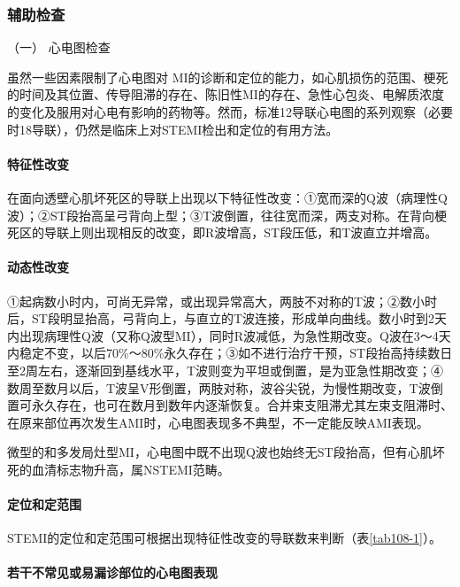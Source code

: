 \subsubsection{辅助检查}

\hypertarget{text00312.htmlux5cux23CHP10-8-2-2-2-1}{}
（一） 心电图检查

虽然一些因素限制了心电图对
MI的诊断和定位的能力，如心肌损伤的范围、梗死的时间及其位置、传导阻滞的存在、陈旧性MI的存在、急性心包炎、电解质浓度的变化及服用对心电有影响的药物等。然而，标准12导联心电图的系列观察（必要时18导联），仍然是临床上对STEMI检出和定位的有用方法。

\paragraph{特征性改变}

在面向透壁心肌坏死区的导联上出现以下特征性改变：①宽而深的Q波（病理性Q波）；②ST段抬高呈弓背向上型；③T波倒置，往往宽而深，两支对称。在背向梗死区的导联上则出现相反的改变，即R波增高，ST段压低，和T波直立并增高。

\paragraph{动态性改变}

①起病数小时内，可尚无异常，或出现异常高大，两肢不对称的T波；②数小时后，ST段明显抬高，弓背向上，与直立的T波连接，形成单向曲线。数小时到2天内出现病理性Q波（又称Q波型MI），同时R波减低，为急性期改变。Q波在3～4天内稳定不变，以后70\%～80\%永久存在；③如不进行治疗干预，ST段抬高持续数日至2周左右，逐渐回到基线水平，T波则变为平坦或倒置，是为亚急性期改变；④数周至数月以后，T波呈V形倒置，两肢对称，波谷尖锐，为慢性期改变，T波倒置可永久存在，也可在数月到数年内逐渐恢复。合并束支阻滞尤其左束支阻滞时、在原来部位再次发生AMI时，心电图表现多不典型，不一定能反映AMI表现。

微型的和多发局灶型MI，心电图中既不出现Q波也始终无ST段抬高，但有心肌坏死的血清标志物升高，属NSTEMI范畴。

\paragraph{定位和定范围}

STEMI的定位和定范围可根据出现特征性改变的导联数来判断（表\ref{tab108-1}）。

\paragraph{若干不常见或易漏诊部位的心电图表现}

